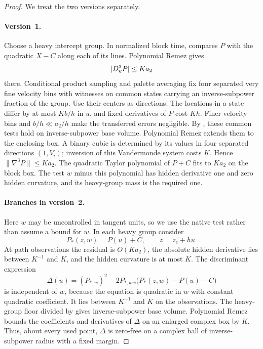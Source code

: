 \begin{proof}
We treat the two versions separately.
\paragraph{Version~1.}
Choose a heavy intercept group. In normalized block time,
 compares \(P\) with the quadratic
\(X-C\) along each of its lines. Polynomial Remez gives
\[
 |D_{\bf v}^3P|\leq Ka_2
\]
there. Conditional product sampling and palette averaging fix
four separated very fine velocity bins with witnesses on common
states carrying an inverse-subpower fraction of the group.
Use their centers as directions. The locations in a state
differ by at most \(Kb/h\) in \(u\), and fixed derivatives of
\(P\) cost \(Kh\). Finer velocity bins and \(b/h\ll a_2/h\)
make the transferred errors negligible.
By , these common
tests hold on inverse-subpower base volume.
Polynomial Remez extends them to the enclosing box.
A binary cubic is determined by its values in four separated
directions \((1,V_i)\); inversion of this Vandermonde system
costs \(K\). Hence \(\|\nabla^3P\|\leq Ka_2\).
The quadratic Taylor polynomial of \(P+C\) fits to \(Ka_2\)
on the block box. The test \(w\) minus this polynomial has hidden
derivative one and zero hidden curvature, and its heavy-group
mass is the required one.

\paragraph{Branches in version~2.}
Here \(w\) may be uncontrolled in tangent units, so we use the
native test rather than assume a bound for \(w\).
In each heavy group consider
\begin{equation}\label{a05:branch-equation}
 P_*(z,w)=P(u)+C,\qquad z=z_c+hu.
\end{equation}
At path observations the residual is \(O(Ka_2)\), the absolute
hidden derivative lies between \(K^{-1}\) and \(K\), and the
hidden curvature is at most \(K\).
The discriminant expression
\[
 \Delta(u)
 =(P_{*,w})^2
       -2P_{*,ww}\bigl(P_*(z,w)-P(u)-C\bigr)
\]
is independent of \(w\), because the equation is quadratic in
\(w\) with constant quadratic coefficient.
It lies between \(K^{-1}\) and \(K\) on the observations.
The heavy-group floor divided by
 gives inverse-subpower base
volume. Polynomial Remez bounds the coefficients and derivatives
of \(\Delta\) on an enlarged complex box by \(K\).
Thus, about every used point, \(\Delta\) is zero-free on a
complex ball of inverse-subpower radius with a fixed margin.


\end{proof}
